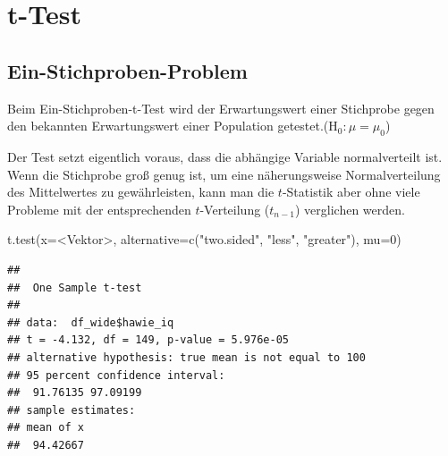 \documentclass[
]{book}
\newenvironment{Shaded}{\begin{snugshade}}{\end{snugshade}}
\newcommand{\AttributeTok}[1]{\textcolor[rgb]{0.77,0.63,0.00}{#1}}
\newcommand{\DecValTok}[1]{\textcolor[rgb]{0.00,0.00,0.81}{#1}}
\newcommand{\FunctionTok}[1]{\textcolor[rgb]{0.00,0.00,0.00}{#1}}
\newcommand{\NormalTok}[1]{#1}
\newcommand{\OtherTok}[1]{\textcolor[rgb]{0.56,0.35,0.01}{#1}}
\newcommand{\SpecialCharTok}[1]{\textcolor[rgb]{0.00,0.00,0.00}{#1}}
\newcommand{\StringTok}[1]{\textcolor[rgb]{0.31,0.60,0.02}{#1}}
\begin{document}
\hypertarget{t-test}{%
\section{t-Test}\label{t-test}}

\hypertarget{ein-stichproben-problem}{%
\subsection{Ein-Stichproben-Problem}\label{ein-stichproben-problem}}

Beim Ein-Stichproben-t-Test wird der Erwartungswert einer Stichprobe gegen den bekannten Erwartungswert einer Population getestet.(\(\text{H}_0: \mu = \mu_0\))

Der Test setzt eigentlich voraus, dass die abhängige Variable normalverteilt ist. Wenn die Stichprobe groß genug ist, um eine näherungsweise Normalverteilung des Mittelwertes zu gewährleisten, kann man die \(t\)-Statistik aber ohne viele Probleme mit der entsprechenden \(t\)-Verteilung (\(t_{n-1}\)) verglichen werden.

\begin{Shaded}
\begin{Highlighting}[]
\FunctionTok{t.test}\NormalTok{(}\AttributeTok{x=}\SpecialCharTok{\textless{}}\NormalTok{Vektor}\SpecialCharTok{\textgreater{}}\NormalTok{, }\AttributeTok{alternative=}\FunctionTok{c}\NormalTok{(}\StringTok{"two.sided"}\NormalTok{, }\StringTok{"less"}\NormalTok{, }\StringTok{"greater"}\NormalTok{), }\AttributeTok{mu=}\DecValTok{0}\NormalTok{)}
\end{Highlighting}
\end{Shaded}

\begin{Shaded}
\end{Shaded}

\begin{verbatim}
## 
##  One Sample t-test
## 
## data:  df_wide$hawie_iq
## t = -4.132, df = 149, p-value = 5.976e-05
## alternative hypothesis: true mean is not equal to 100
## 95 percent confidence interval:
##  91.76135 97.09199
## sample estimates:
## mean of x 
##  94.42667
\end{verbatim}
\end{document}
